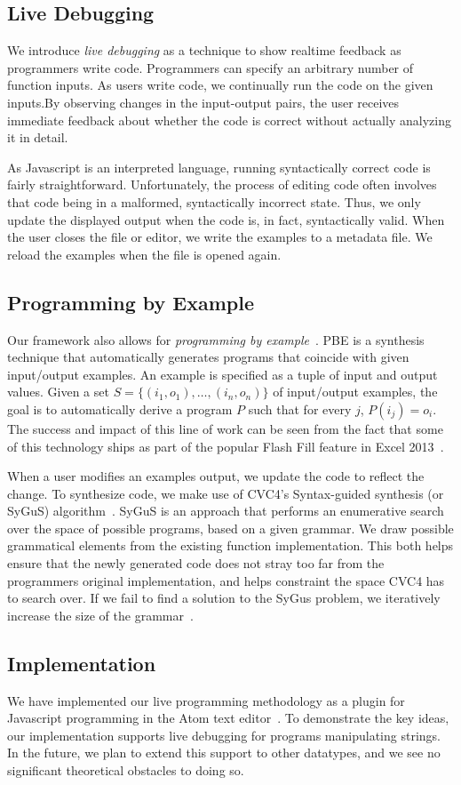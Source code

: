 \subsection{Live Debugging}
We introduce \textit{live debugging} as a technique to show realtime feedback as programmers write code.
Programmers can specify an arbitrary number of function inputs.
As users write code, we continually run the code on the given inputs.By observing changes in the input-output pairs,
the user receives immediate feedback about whether the code is correct without actually analyzing it in detail.

As Javascript is an interpreted language, running syntactically correct code is fairly straightforward.
Unfortunately, the process of editing code often involves that code
being in a malformed, syntactically incorrect state.
Thus, we only update the displayed output when the code is, in fact,
syntactically valid.
When the user closes the file or editor,
we write the examples to a metadata file.
We reload the examples when the file is opened again.

\subsection{Programming by Example}
Our framework also allows for \textit{programming by example}~\cite{cypher93,lieberman01,synasc12}.
PBE  is a synthesis technique that automatically generates programs that coincide with given input/output examples. An example is specified as a tuple of input and output values. Given a set $S= \{(i_1, o_1),\ldots, (i_n, o_n)\}$ of input/output examples, the goal is to automatically derive a program $P$ such that for every $j$, $P(i_j) = o_i$. The success and impact of this line of work can be seen from the fact that some of this technology ships as part of the popular Flash Fill feature in Excel 2013~\cite{flashFillPOPL}.

When a user modifies an examples output, we update the code to reflect the change.
To synthesize code, we make use of CVC4's Syntax-guided synthesis (or SyGuS) algorithm~\cite{reynolds2017sygus}.
SyGuS is an approach that performs an enumerative search over the space of possible programs,
based on a given grammar.
We draw possible grammatical elements from the existing function implementation.
This both helps ensure that the newly generated code does not stray too far from the programmers original implementation,
and helps constraint the space CVC4 has to search over.
If we fail to find a solution to the SyGus problem, we iteratively increase the size of the grammar~.

\subsection{Implementation}
We have implemented our live programming methodology as a plugin
for Javascript programming in the Atom text editor~\cite{Atom}.
To demonstrate the key ideas, our implementation supports live debugging for programs manipulating strings.
In the future, we plan to extend this support to other datatypes,
and we see no significant theoretical obstacles to doing so.